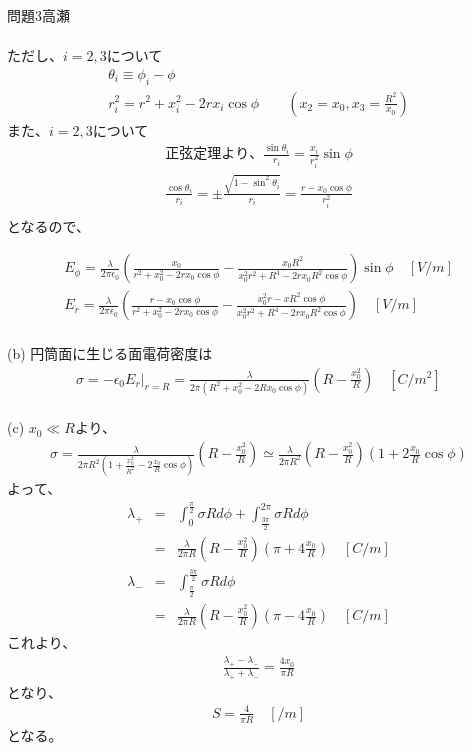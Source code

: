 \documentclass[fleqn]{jbook}
\begin{document}
\begin{answer}{問題3}{高瀬}
\begin{enumerate}
\begin{eqnarray}
	\end{eqnarray}
	ただし、$i=2,3$について
	\begin{eqnarray}
		\theta_i \equiv \phi_i - \phi \\
		r_i^2 = r^2+x_i^2-2rx_i \cos \phi \qquad (x_2 = x_0, x_3 = \frac{R^2}{x_0})
	\end{eqnarray}
	また、$i=2,3$について
	\begin{eqnarray}
		正弦定理より、\frac{\sin \theta_i}{r_i} = \frac{x_i}{r_i^2}\sin \phi \\
		\frac{\cos \theta_i}{r_i} = \pm \frac{\sqrt{1-\sin^2 \theta_i}}{r_i}
		=\frac{r-x_0 \cos \phi}{r_i^2} \\  
	\end{eqnarray}		 
	となるので、

	\begin{eqnarray}
		E_\phi = \frac{\lambda}{2 \pi \epsilon_0}
		(\frac{x_0}{r^2+x_0^2-2rx_0 \cos \phi}
		-\frac{x_0R^2}{x_0^2r^2+R^4-2rx_0R^2\cos\phi}) \sin \phi \quad [V/m]
		\\
		E_r = \frac{\lambda}{2 \pi \epsilon_0}
		(\frac{r-x_0\cos\phi}{r^2+x_0^2-2rx_0 \cos \phi}
		-\frac{x_0^2r-xR^2\cos\phi}{x_0^2r^2+R^4-2rx_0R^2\cos\phi}) \quad [V/m]
	\end{eqnarray}
	\\
	
	(b) 
	円筒面に生じる面電荷密度は
	\begin{eqnarray}
		\sigma = -\epsilon_0 E_r | _{r=R}
			=\frac{\lambda}{2 \pi (R^2+x_0^2-2Rx_0 \cos \phi)}(R-\frac{x_0^2}{R}) \quad [C/m^2]
	\end{eqnarray}
	\\
	
	(c)
	$x_0 \ll R$より、
	\begin{eqnarray}
		\sigma = \frac{\lambda}{2 \pi R^2 (1+\frac{x_0^2}{R^2}-2\frac{x_0}{R}\cos \phi)}(R-\frac{x_0^2}{R})
		\simeq \frac{\lambda}{2\pi R^2}(R-\frac{x_0^2}{R})(1+2\frac{x_0}{R}\cos \phi)
		\end{eqnarray}
	よって、
	\begin{eqnarray}
		\lambda_+ &=& \int_0^{\frac{\pi}{2}}\sigma Rd\phi
					+\int_{\frac{3\pi}{2}}^{2\pi}\sigma Rd\phi \\
				&=&\frac{\lambda}{2\pi R}(R-\frac{x_0^2}{R})
				(\pi+4\frac{x_0}{R} ) \quad [C/m]\\
		\lambda_- &=& \int_{\frac{\pi}{2}}^{\frac{3\pi}{2}}\sigma Rd\phi \\
				&=&\frac{\lambda}{2\pi R}(R-\frac{x_0^2}{R})(\pi-4\frac{x_0}{R}) \quad [C/m]
	\end{eqnarray}
	これより、
	\begin{eqnarray}
		\frac{\lambda_+ - \lambda_-}{\lambda_+ + \lambda_- }
		= \frac{4 x_0}{\pi R}
	\end{eqnarray}
	となり、
	\begin{eqnarray}
		S=\frac{4}{\pi R} \quad [/m]
	\end{eqnarray}
	となる。
\end{enumerate}


\end{answer}
\end{document}
